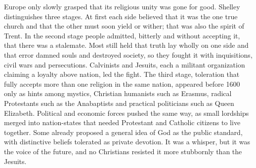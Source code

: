 Europe only slowly grasped that its religious unity was gone for good. Shelley distinguishes three
stages. At first each side believed that it was the one true church and that the other must soon
yield or wither; that was also the spirit of Trent. In the second stage people admitted, bitterly and
without accepting it, that there was a stalemate. Most still held that truth lay wholly on one side
and that error damned souls and destroyed society, so they fought it with inquisitions, civil wars
and persecutions. Calvinists and Jesuits, each a militant organization claiming a loyalty above
nation, led the fight. The third stage, toleration that fully accepts more than one religion in the same nation, appeared before 1600 only as hints among mystics, Christian humanists such as
Erasmus, radical Protestants such as the Anabaptists and practical politicians such as Queen
Elizabeth. Political and economic forces pushed the same way, as small lordships merged into
nation-states that needed Protestant and Catholic citizens to live together. Some already proposed a
general idea of God as the public standard, with distinctive beliefs tolerated as private devotion.
It was a whisper, but it was the voice of the future, and no Christians resisted it more stubbornly
than the Jesuits.

\begin{keyfacts}
\end{keyfacts}

